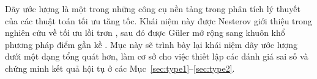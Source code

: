 \begin{essayonly}
Dãy ước lượng là một trong những công cụ nền tảng trong phân tích lý thuyết của các thuật toán tối ưu tăng tốc. Khái niệm này được Nesterov giới thiệu trong nghiên cứu về tối ưu lồi trơn \citep{nesterov2004}, sau đó được Güler mở rộng sang khuôn khổ phương pháp điểm gần kề \citep{guler1992}. Mục này sẽ trình bày lại khái niệm dãy ước lượng dưới một dạng tổng quát hơn, làm cơ sở cho việc thiết lập các đánh giá sai số và chứng minh kết quả hội tụ ở các Mục~\ref{sec:type1}--\ref{sec:type2}.
\end{essayonly}
